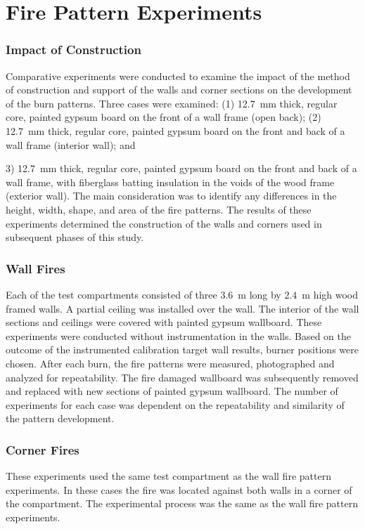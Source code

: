 \documentclass[twoside]{uocthesis}
\begin{document}
\section{Fire Pattern Experiments}

\subsubsection{Impact of Construction}

Comparative experiments were conducted to examine the impact of the method of construction and support of the walls and corner sections on the development of the burn patterns.  Three cases were examined: (1) 12.7~mm thick, regular core, painted gypsum board on the front of a wall frame (open back); (2) 12.7~mm thick, regular core, painted gypsum board on the front and back of a wall frame (interior wall); and {3) 12.7~mm thick, regular core, painted gypsum board on the front and back of a wall frame, with fiberglass batting insulation in the voids of the wood frame (exterior wall).  The main consideration was to identify any differences in the height, width, shape, and area of the fire patterns. The results of these experiments determined the construction of the walls and corners used in subsequent phases of this study.

\subsubsection{Wall Fires}

Each of the test compartments consisted of three 3.6~m long by 2.4~m high wood framed walls. A partial ceiling was installed over the wall. The interior of the wall sections and ceilings were covered with painted gypsum wallboard.  These experiments were conducted without instrumentation in the walls.  Based on the outcome of the instrumented calibration target wall results, burner positions were chosen. After each burn, the fire patterns were measured, photographed and analyzed for repeatability. The fire damaged wallboard was subsequently removed and replaced with new sections of painted gypsum wallboard. The number of experiments for each case was dependent on the repeatability and similarity of the pattern development.

\subsubsection{Corner Fires}

These experiments used the same test compartment as the wall fire pattern experiments.  In these cases the fire was located against both walls in a corner of the compartment.  The experimental process was the same as the wall fire pattern experiments.

}
\end{document}

